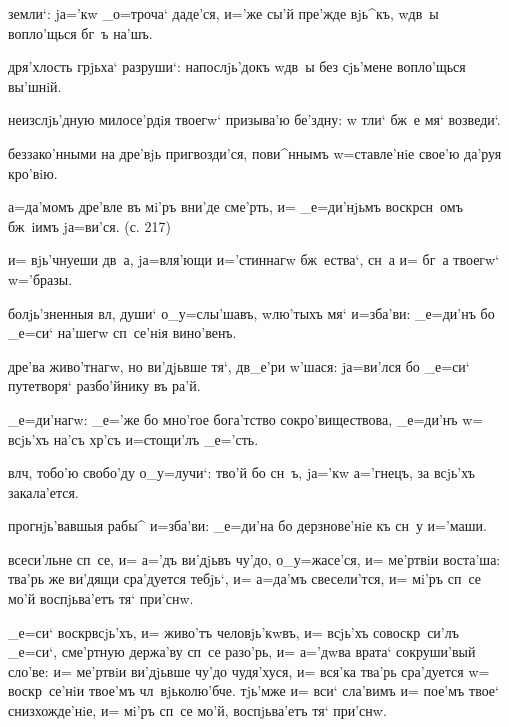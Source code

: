 земли`: jа='кw _о=троча` даде'ся, и='же сы'й пре'жде 
вjь^къ, w\т дв~ы вопло'щься бг~ъ на'шъ.

дря'хлость грjьха` разруши`: напослjь'докъ w\т дв~ы без\ъ 
сjь'мене вопло'щься вы'шнiй.


неизслjь'дную милосе'рдiя твоегw` призыва'ю бе'здну: w\т 
тли` бж~е мя` возведи`.

беззако'нными на дре'вjь пригвозди'ся, пови^ннымъ 
w=ставле'нiе свое'ю да'руя кро'вiю.

а=да'момъ дре'вле въ мi'ръ вни'де сме'рть, и= _е=ди'нjьмъ 
воскр сн~омъ бж~iимъ jа=ви'ся. (с. 217)

и= вjь'чнуеши дв~а, jа=вля'ющи и='стиннагw бж~ества`, 
сн~а и= бг~а твоегw` w='бразы.


болjь'зненныя вл, души` о_у=слы'шавъ, w\т лю'тыхъ мя` 
и=зба'ви: _е=ди'нъ бо _е=си` на'шегw сп~се'нiя вино'венъ.

дре'ва живо'тнагw, но ви'дjьвше тя`, дв_е'ри 
w'шася: jа=ви'лся бо _е=си` путетворя` разбо'йнику 
въ ра'й.

_е=ди'нагw: _е='же бо мно'гое бога'тство 
сокро'виществова, _е=ди'нъ w= всjь'хъ на'съ хр'съ 
и=стощи'лъ _е='сть.


вл ч, тобо'ю свобо'ду о_у=лучи`: тво'й бо сн~ъ, 
jа='кw а='гнецъ, за всjь'хъ закала'ется.

прогнjь'вавшыя рабы^ и=зба'ви: _е=ди'на бо дерзнове'нiе 
къ сн~у и='маши.

всеси'льне сп~се, и= а='дъ ви'дjьвъ чу'до, о_у=жасе'ся, 
и= ме'ртвiи воста'ша: тва'рь же ви'дящи сра'дуется 
тебjь`, и= а=да'мъ свесели'тся, и= мi'ръ сп~се мо'й 
воспjьва'етъ тя` при'снw.

_е=си` воскр всjь'хъ, и= живо'тъ человjь'кwвъ, и= 
всjь'хъ совоскр~си'лъ _е=си`, сме'ртную держа'ву сп~се 
разо'рь, и= а='дwва врата` сокруши'вый сло'ве: и= 
ме'ртвiи ви'дjьвше чу'до чудя'хуся, и= вся'ка тва'рь 
сра'дуется w= воскр~се'нiи твое'мъ чл~вjьколю'бче. 
тjь'мже и= вси` сла'вимъ и= пое'мъ твое` снизхожде'нiе, 
и= мi'ръ сп~се мо'й, воспjьва'етъ тя` при'снw.

